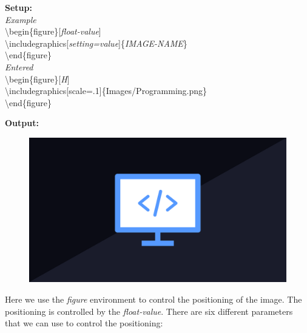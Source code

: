 \documentclass{article}
\newcommand{\jbs}[1]{\textbackslash{}#1} %
\begin{document}
\begin{multicols}{2}
    \noindent
    \begin{minipage}{0.70\linewidth}
        \noindent
        \vspace{0.5em}
        {\large\textbf{Setup:}} \\
        \textit{Example} \\
        \jbs{begin\{figure\}[\textit{float-value}]} \\
        \jbs{includegraphics[\textit{setting=value}]\{\textit{IMAGE-NAME}\}} \\
        \jbs{end\{figure\}} \\[1em] %

        \textit{Entered} \\
        \jbs{begin\{figure\}[\textit{H}]} \\
        \jbs{includegraphics[scale=.1]\{Images/Programming.png\}} \\
        \jbs{end\{figure\}}
    \end{minipage}
    \columnbreak
   
        \noindent
        {\large\textbf{Output:}} \\
        \noindent
        \begin{figure}[H]
            \includegraphics[scale=0.05]{Images/Programming.png} %
            \label{fig:programming}
        \end{figure}
\end{multicols} %
Here we use the \textit{figure} environment to control the positioning of the image. The positioning is 
controlled by the \textit{float-value}. There are six different parameters that we can use to control the positioning:
\end{document}
